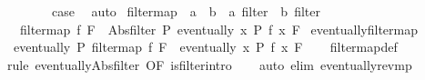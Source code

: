 \begin{isabellebody}
\ \ \isamarkupfalse%
\isanewline
\ \ \isamarkupfalse%
\ \isamarkupfalse%
\ {\isacharquery}{\kern0pt}case\ \isacommand{{\isachardot}{\kern0pt}}\isamarkupfalse%
\isanewline
{}\isamarkupfalse%
\ auto%
\endisatagproof
{\isafoldproof}%
%
\isadelimproof
%
\endisadelimproof
%
\isadelimdocument
%
\endisadelimdocument
%
\isatagdocument
%
\isamarkuptrue%
%
\endisatagdocument
{\isafolddocument}%
%
\isadelimdocument
%
\endisadelimdocument
{}\isamarkupfalse%
\ filtermap\ {\isacharcolon}{\kern0pt}{\isacharcolon}{\kern0pt}\ {\isachardoublequoteopen}{\isacharparenleft}{\kern0pt}{\isacharprime}{\kern0pt}a\ {\isasymRightarrow}\ {\isacharprime}{\kern0pt}b{\isacharparenright}{\kern0pt}\ {\isasymRightarrow}\ {\isacharprime}{\kern0pt}a\ filter\ {\isasymRightarrow}\ {\isacharprime}{\kern0pt}b\ filter{\isachardoublequoteclose}\isanewline
\ \ \ {\isachardoublequoteopen}filtermap\ f\ F\ {\isacharequal}{\kern0pt}\ Abs{\isacharunderscore}{\kern0pt}filter\ {\isacharparenleft}{\kern0pt}{\isasymlambda}P{\isachardot}{\kern0pt}\ eventually\ {\isacharparenleft}{\kern0pt}{\isasymlambda}x{\isachardot}{\kern0pt}\ P\ {\isacharparenleft}{\kern0pt}f\ x{\isacharparenright}{\kern0pt}{\isacharparenright}{\kern0pt}\ F{\isacharparenright}{\kern0pt}{\isachardoublequoteclose}\isanewline
\isanewline
{}\isamarkupfalse%
\ eventually{\isacharunderscore}{\kern0pt}filtermap{\isacharcolon}{\kern0pt}\isanewline
\ \ {\isachardoublequoteopen}eventually\ P\ {\isacharparenleft}{\kern0pt}filtermap\ f\ F{\isacharparenright}{\kern0pt}\ {\isacharequal}{\kern0pt}\ eventually\ {\isacharparenleft}{\kern0pt}{\isasymlambda}x{\isachardot}{\kern0pt}\ P\ {\isacharparenleft}{\kern0pt}f\ x{\isacharparenright}{\kern0pt}{\isacharparenright}{\kern0pt}\ F{\isachardoublequoteclose}\isanewline
%
\isadelimproof
\ \ %
\endisadelimproof
%
\isatagproof
{}\isamarkupfalse%
\ filtermap{\isacharunderscore}{\kern0pt}def\isanewline
\ \ \isamarkupfalse%
\ {\isacharparenleft}{\kern0pt}rule\ eventually{\isacharunderscore}{\kern0pt}Abs{\isacharunderscore}{\kern0pt}filter\ {\isacharbrackleft}{\kern0pt}OF\ is{\isacharunderscore}{\kern0pt}filter{\isachardot}{\kern0pt}intro{\isacharbrackright}{\kern0pt}{\isacharparenright}{\kern0pt}\isanewline
\ \ \isamarkupfalse%
\ {\isacharparenleft}{\kern0pt}auto\ elim{\isacharbang}{\kern0pt}{\isacharcolon}{\kern0pt}\ eventually{\isacharunderscore}{\kern0pt}rev{\isacharunderscore}{\kern0pt}mp{\isacharparenright}{\kern0pt}\isanewline

\end{isabellebody}

